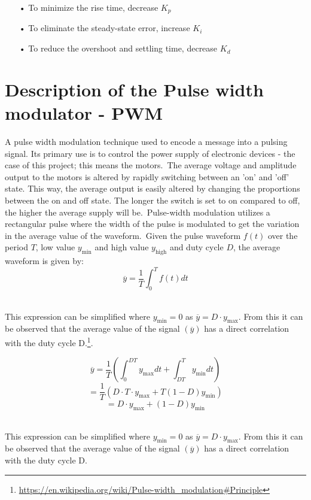 \begin{enumerate}
		\item[•]To minimize the rise time, decrease $K_p$
		\item[•]To eliminate the steady-state error, increase $K_i$
		\item[•]To reduce the overshoot and settling time, decrease $K_d$
	\end{enumerate}

\section{Description of the Pulse width modulator - PWM}

A pulse width modulation technique used to encode a message into a pulsing signal. Its primary use is to control the power supply of electronic devices - the case of this project; this means the motors.\
The average voltage and amplitude output to the motors is altered by rapidly switching between an 'on' and 'off' state. This way, the average output is easily altered by changing the proportions between the on and off state. The longer the switch is set to on compared to off, the higher the average supply will be.\
Pulse-width modulation utilizes a rectangular pulse where the width of the pulse is modulated to get the variation in the average value of the waveform.\ Given the pulse waveform $f(t)$ over the period $T$, low value $y_\mathrm{min}$ and high value $y_\mathrm{high}$ and duty cycle $D$, the average waveform is given by: \\

$$\overline{y}=\frac{1}{T}\int_{0}^{T}f(t)dt$$\

This expression can be simplified where $y_\mathrm{min}=0$ as $\overline{y}=D \cdot y_\mathrm{max}$. From this it can be observed that the average value of the signal $(\overline{y})$ has a direct correlation with the duty cycle D.\footnote{\url{https://en.wikipedia.org/wiki/Pulse-width_modulation\#Principle}}.
 
 $$\overline{y}=\frac{1}{T}\left(\int_{0}^{DT}y_\mathrm{max}dt+\int_{DT}^{T}y_\mathrm{min}dt\right)$$
 $$=\frac{1}{T}\left(D \cdot T \cdot y_\mathrm{max}+T(1-D)y_\mathrm{min}\right)$$
 $$=D \cdot y_\mathrm{max}+\left(1-D\right)y_\mathrm{min}$$\
 
This expression can be simplified where $y_\mathrm{min}=0$ as $\overline{y}=D \cdot y_\mathrm{max}$. From this it can be observed that the average value of the signal $(\overline{y})$ has a direct correlation with the duty cycle D. 

